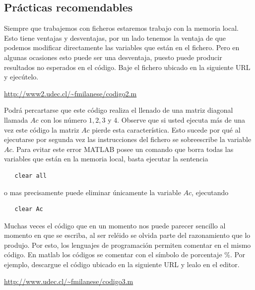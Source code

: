 \documentclass[11pt]{article}
\begin{document}
  \subsection{Pr\'acticas recomendables}
  Siempre que trabajemos con ficheros estaremos trabajo con la memoria local. Esto tiene ventajas 
  y desventajas, por un lado tenemos la ventaja de que podemos modificar directamente las variables 
  que est\'an en el fichero. Pero en algunas ocasiones esto puede ser una desventaja, puesto 
  puede producir resultados no esperados en el c\'odigo. Baje el fichero ubicado en la siguiente 
  URL y ejec\'utelo.

\url{http://www2.udec.cl/~fmilanese/codigo2.m}
  
  Podr\'a percartarse que este c\'odigo realiza el llenado de una matriz diagonal llamada $Ac$ con los 
  n\'umero $1,2,3$ y $4$. Observe que si usted ejecuta m\'as de una vez este c\'odigo la matriz $Ac$ pierde 
  esta caracter\'istica. Esto sucede por qu\'e al ejecutarse por segunda vez las instrucciones del fichero 
  se sobreescribe la variable $Ac$. Para evitar este error MATLAB posee un comando que borra todas las variables 
  que est\'an en la memoria local, basta ejecutar la sentencia 
  \begin{verbatim}
   clear all
  \end{verbatim}
  o mas precisamente puede eliminar \'unicamente la variable $Ac$, ejecutando
  \begin{verbatim}
   clear Ac
  \end{verbatim}
  Muchas veces el c\'odigo que en un momento nos puede parecer sencillo al momento en que se escriba, al ser rel\'eido 
  se olvida parte del razonamiento que lo produjo. Por esto, los lenguajes de programaci\'on permiten 
  comentar en el mismo c\'odigo. En matlab los c\'odigos se comentar con el s\'imbolo de porcentaje \%. Por ejemplo, 
  descargue el c\'odigo ubicado en la siguiente URL y lealo en el editor.
  
  \url{ http://www.udec.cl/~fmilanese/codigo3.m}
    


\newpage
\end{document}
